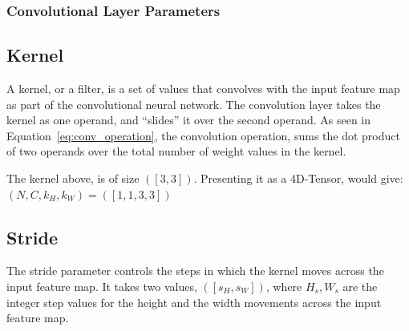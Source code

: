 \subsubsection{Convolutional Layer Parameters}
\subsection*{Kernel}
A kernel, or a filter, is a set of values that convolves with
the input feature map
as part of the convolutional neural network.
The convolution layer takes the kernel as one operand,
and ``slides'' it over the second operand.
As seen in Equation~\ref{eq:conv_operation},
the convolution operation, sums the dot product of two operands
over the total number of weight values in the kernel.

\begin{figure}[H]
    \centering
\end{figure}

The kernel above, is of size \( \left( \left[ 3, 3 \right] \right) \).
Presenting it as a 4D-Tensor, would give: \( \left( N, C, k_{H}, k_{W} \right)  = \left( \left[ 1, 1, 3, 3 \right] \right)  \)

\subsection*{Stride}
The stride parameter controls the steps in which the kernel
moves across the input feature map.
It takes two values, \( \left( \left[ s_{H}, s_{W} \right] \right) \),
where \( H_{s}, W_{s} \) are the integer step values for the
height and the width movements across the input feature map.


